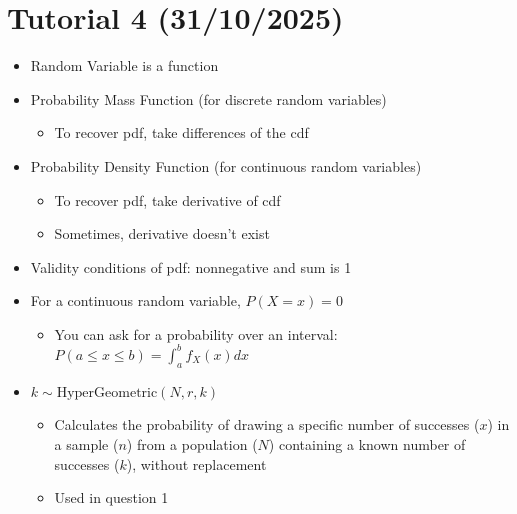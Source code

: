 \documentclass{article}
\begin{document}
\section{Tutorial 4 (31/10/2025)}
\begin{itemize}
    \item Random Variable is a function
    \item Probability Mass Function (for discrete random variables)
    \begin{itemize}
        \item To recover pdf, take differences of the cdf
    \end{itemize}
    \item Probability Density Function (for continuous random variables)
    \begin{itemize}
        \item To recover pdf, take derivative of cdf
        \item Sometimes, derivative doesn't exist
    \end{itemize}
    \item Validity conditions of pdf: nonnegative and sum is 1
    \item For a continuous random variable, $P(X=x)=0$
    \begin{itemize}
        \item You can ask for a probability over an interval: $P(a \le x \le b) = \int_a^b f_X(x)dx$
    \end{itemize}
    \item $k \sim \text{HyperGeometric}(N,r,k)$
    \begin{itemize}
        \item Calculates the probability of drawing a specific number of successes (\(x\)) in a sample (\(n\)) from a population (\(N\)) containing a known number of successes (\(k\)), without replacement
        \item Used in question 1
    \end{itemize}

\end{itemize}
\end{document}
